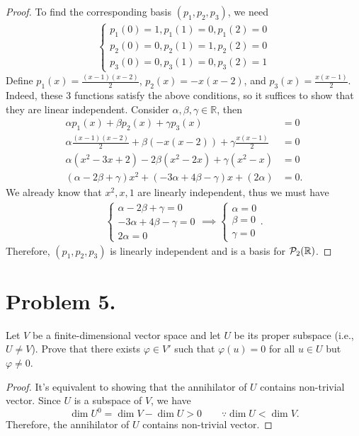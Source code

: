 \documentclass{article}
\begin{document}
\begin{proof}
    To find the corresponding basis $(p_1, p_2, p_3)$, we need 
    \begin{align*}
        \begin{cases}
            p_1(0) = 1, p_1(1) = 0, p_1(2) = 0 \\
            p_2(0) = 0, p_2(1) = 1, p_2(2) = 0 \\
            p_3(0) = 0, p_3(1) = 0, p_3(2) = 1
        \end{cases}
    \end{align*}
    Define $p_1(x) = \frac{(x-1)(x-2)}{2}$, $p_2(x) = -x(x-2)$, and $p_3(x) = \frac{x(x-1)}{2}$. 
    Indeed, these 3 functions satisfy the above conditions, so it suffices to show that 
    they are linear independent. Consider $\alpha, \beta, \gamma\in\mathbb{R}$, then
    \begin{align*}
        \alpha p_1(x) + \beta p_2(x) + \gamma p_3(x) & = 0 \\
        \alpha \frac{(x-1)(x-2)}{2} + \beta (-x(x-2)) + \gamma \frac{x(x-1)}{2} & = 0 \\
        \alpha (x^2-3x+2) - 2\beta (x^2-2x) + \gamma (x^2-x) & = 0 \\
        (\alpha-2\beta+\gamma)x^2 + (-3\alpha+4\beta-\gamma)x + (2\alpha) & = 0.
    \end{align*}
    We already know that $x^2, x, 1$ are linearly independent, thus we must have
    \begin{align*}
        \begin{cases}
            \alpha-2\beta+\gamma = 0 \\
            -3\alpha+4\beta-\gamma = 0 \\
            2\alpha = 0
        \end{cases}
        \implies 
        \begin{cases}
            \alpha = 0 \\
            \beta = 0 \\
            \gamma = 0
        \end{cases}.
    \end{align*}
    Therefore, $(p_1, p_2, p_3)$ is linearly independent and is a basis for ${\cal P}_2(\mathbb{R})$.
\end{proof}

\newpage
\section*{Problem 5.}
Let $V$ be a finite-dimensional vector space and let $U$ be its proper subspace 
(i.e., $U\neq V$). Prove that there exists $\varphi\in V'$ such that $\varphi(u)=0$ for all $u\in U$ 
but $\varphi\neq 0$.
\begin{proof}
    It's equivalent to showing that the annihilator of $U$ contains non-trivial vector. Since $U$ is 
    a subspace of $V$, we have 
    $$\dim U^0 = \dim V - \dim U > 0 \qquad \because \dim U < \dim V.$$
    Therefore, the annihilator of $U$ contains non-trivial vector.
\end{proof}
\end{document}
